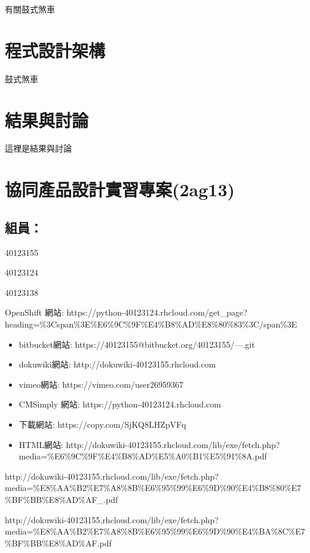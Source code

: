 \documentclass[]{article}
\begin{document}
有關鼓式煞車

\section{程式設計架構}\label{ux7a0bux5f0fux8a2dux8a08ux67b6ux69cb-2}

鼓式煞車

\section{結果與討論}\label{ux7d50ux679cux8207ux8a0eux8ad6-2}

這裡是結果與討論

\section{協同產品設計實習專案(2ag13)}\label{ux5354ux540cux7522ux54c1ux8a2dux8a08ux5be6ux7fd2ux5c08ux68482ag13}

\subsection{組員：}\label{ux7d44ux54e1-1}

40123155

40123124

40123138

OpenShift 網站:
https://python-40123124.rhcloud.com/get\_page?heading=\%3Cspan\%3E\%E6\%9C\%9F\%E4\%B8\%AD\%E8\%80\%83\%3C/span\%3E

\begin{itemize}
\item
  bitbucket網站: https://40123155@bitbucket.org/40123155/---.git
\item
  dokuwiki網站: http://dokuwiki-40123155.rhcloud.com
\item
  vimeo網站: https://vimeo.com/user26959367
\item
  CMSimply 網站: https://python-40123124.rhcloud.com
\item
  下載網站: https://copy.com/SjKQ8LHZpVFq
\item
  HTML網站:
  http://dokuwiki-40123155.rhcloud.com/lib/exe/fetch.php?media=\%E6\%9C\%9F\%E4\%B8\%AD\%E5\%A0\%B1\%E5\%91\%8A.pdf
\end{itemize}

http://dokuwiki-40123155.rhcloud.com/lib/exe/fetch.php?media=\%E8\%AA\%B2\%E7\%A8\%8B\%E6\%95\%99\%E6\%9D\%90\%E4\%B8\%80\%E7\%BF\%BB\%E8\%AD\%AF\_.pdf

http://dokuwiki-40123155.rhcloud.com/lib/exe/fetch.php?media=\%E8\%AA\%B2\%E7\%A8\%8B\%E6\%95\%99\%E6\%9D\%90\%E4\%BA\%8C\%E7\%BF\%BB\%E8\%AD\%AF.pdf
\end{document}
